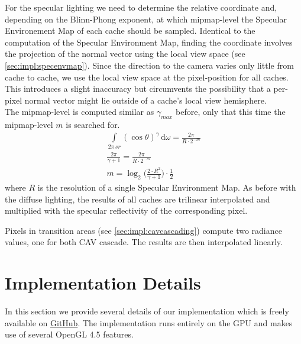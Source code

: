 \documentclass[thesis.tex]{subfiles}
\begin{document}
For the specular lighting we need to determine the relative coordinate and, depending on the Blinn-Phong exponent, at which mipmap-level the Specular Environement Map of each cache should be sampled.
Identical to the computation of the Specular Environment Map, finding the coordinate involves the projection of the normal vector using the local view space (see \autoref{sec:impl:specenvmap}).
Since the direction to the camera varies only little from cache to cache, we use the local view space at the pixel-position for all caches.
This introduces a slight inaccuracy but circumvents the possibility that a per-pixel normal vector might lie outside of a cache's local view hemisphere.\\
The mipmap-level is computed similar as $\gamma_{max}$ before, only that this time the mipmap-level $m$ is searched for.
\begin{align}
\int\limits_{2\pi\,sr} (\cos\theta)^{\gamma}  \,\mathrm{d}\omega = \frac{2\pi}{R \cdot 2^{-m}}\\
\frac{2\pi}{\gamma + 1} = \frac{2\pi}{R \cdot 2^{-m}}\\
m = \log_2 \Big(\frac{2 \cdot R^2}{\gamma + 1} \Big) \cdot \frac{1}{2}
\end{align}
where $R$ is the resolution of a single Specular Environment Map.
As before with the diffuse lighting, the results of all caches are trilinear interpolated and multiplied with the specular reflectivity of the corresponding pixel.

Pixels in transition areas (see \autoref{sec:impl:cavcascading}) compute two radiance values, one for both CAV cascade.
The results are then interpolated linearly.


\section{Implementation Details}
In this section we provide several details of our implementation which is freely available on \href{https://github.com/Wumpf/DynamicRadianceVolume}{GitHub}.
The implementation runs entirely on the GPU and makes use of several OpenGL 4.5 features.
\end{document}
